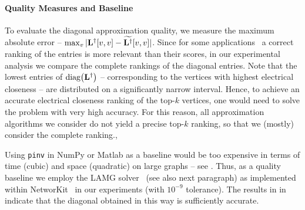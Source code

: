 \paragraph{Quality Measures and Baseline}
To evaluate the diagonal approximation quality, we measure the maximum absolute error -- \ie
$\max_v|\mathbf{L}^\dagger[v,v] - \widetilde{\mathbf{L}^\dagger}[v,v]|$.
Since for some applications~\cite{newman2018networks,DBLP:conf/faw/OkamotoCL08} a correct
ranking of the entries is more relevant than their scores, in our experimental analysis
we compare the complete rankings of the diagonal entries.
Note that the lowest entries of $\diag{\Linv}$ -- corresponding to the
vertices with highest electrical closeness -- are distributed on a
significantly narrow interval.
Hence, to achieve an accurate electrical closeness ranking of the top-$k$
vertices, one would need to solve the problem with very high accuracy.
For this reason, all approximation algorithms we consider do not yield a
precise top-$k$ ranking, so that we (mostly) consider the complete ranking.,

Using \texttt{pinv} in NumPy or Matlab as a baseline would be too expensive in
terms of time (cubic) and space (quadratic) on large graphs -- see
. Thus, as a quality baseline we employ the
LAMG solver~\cite{DBLP:journals/siamsc/LivneB12} (see also next paragraph)
as implemented within NetworKit~\cite{DBLP:journals/netsci/StaudtSM16}
in our experiments (with $10^{-9}$ tolerance).
The results in  in 
indicate that the diagonal obtained in this way is sufficiently accurate.

